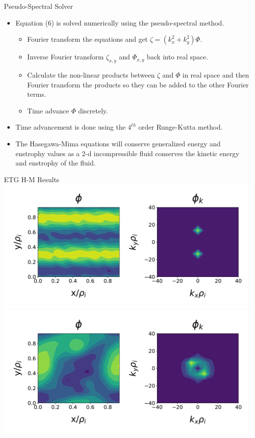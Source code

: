 \documentclass[aspectratio=43]{beamer}
\begin{document}
   \begin{frame}{Pseudo-Spectral Solver}
      \begin{itemize}
         \item Equation (6) is solved numerically using the pseudo-spectral method.
            \begin{itemize}
               \item Fourier transform the equations and get $\zeta=(k_x^2 + k_y^2)\Phi$.
               \item Inverse Fourier transform $\zeta_{x,y}$ and $\Phi_{x,y}$ back into real space.
               \item Calculate the non-linear products between $\zeta$ and $\Phi$ in real space and then Fourier transform the
               products so they can be added to the other Fourier terms.
               \item Time advance $\Phi$ discretely.
            \end{itemize}
         \vspace{5mm}
         \item Time advancement is done using the $4^{th}$ order Runge-Kutta method.
         \vspace{5mm}
         \item The Hasegawa-Mima equations will conserve generalized energy and enstrophy values as a 2-d incompressible fluid conserves
         the kinetic energy and enstrophy of the fluid.
      \end{itemize}
   \end{frame}

   \begin{frame}{ETG H-M Results}
      \includegraphics[height=.4\textheight, width=.7\textwidth]{Images/hmPhiETG_init.pdf}
      \includegraphics[height=.4\textheight, width=.7\textwidth]{Images/hmPhiETG_iso.pdf}
   \end{frame}
\end{document}
